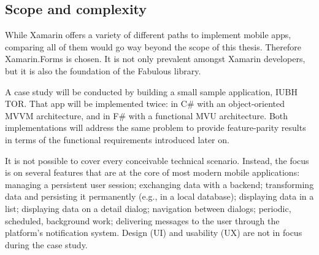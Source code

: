 \subsection{Scope and complexity}

While Xamarin offers a variety of different paths to implement mobile apps, comparing all of them would go way beyond the scope of this thesis. Therefore Xamarin.Forms is chosen. It is not only prevalent amongst Xamarin developers, but it is also the foundation of the Fabulous library.

A case study will be conducted by building a small sample application, IUBH TOR. That app will be implemented twice: in C\# with an object-oriented MVVM architecture, and in F\# with a functional MVU architecture. Both implementations will address the same problem to provide feature-parity results in terms of the functional requirements introduced later on. 

It is not possible to cover every conceivable technical scenario. Instead, the focus is on several features that are at the core of most modern mobile applications: managing a persistent user session; exchanging data with a backend; transforming data and persisting it permanently (e.g., in a local database); displaying data in a list; displaying data on a detail dialog; navigation between dialogs; periodic, scheduled, background work; delivering messages to the user through the platform's notification system. Design (UI) and usability (UX) are not in focus during the case study.
